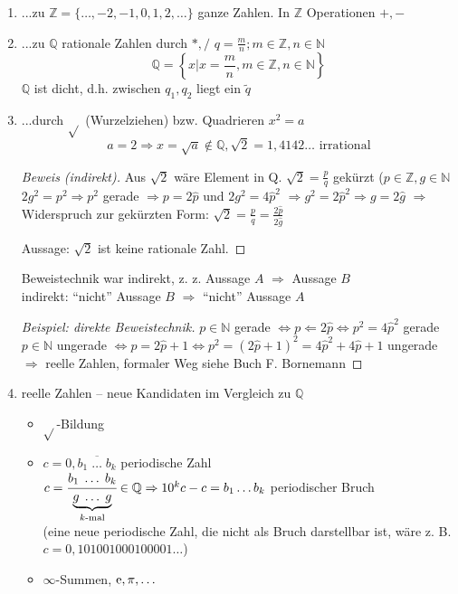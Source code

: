 \begin{enumerate}
 \item ...zu $\mathbb{Z} = \{\ldots,-2,-1,0,1,2,\ldots\}$ ganze Zahlen. In $\mathbb{Z}$ Operationen $+,-$
 \item ...zu $\mathbb{Q}$ rationale Zahlen durch $*,/$ $q=\frac{m}{n}; m \in \mathbb{Z}, n \in \mathbb{N}$
  \begin{equation*}\mathbb{Q} = \left\{x | x=\frac{m}{n}, m \in \mathbb{Z}, n \in \mathbb{N} \right\}\end{equation*}
  $\mathbb{Q}$ ist dicht, d.h. zwischen $q_1, q_2$ liegt ein $\tilde{q}$
 \item ...durch $\sqrt{}$ (Wurzelziehen) bzw. Quadrieren $x^2=a$
 \begin{equation*}a=2 \Rightarrow x = \sqrt{a} \notin \mathbb{Q}, \sqrt{2}=1,4142\ldots\text{ irrational}\end{equation*}

\begin{proof}[Beweis (indirekt)]
Aus $\sqrt{2}$ wäre Element in Q. $\sqrt{2}=\frac{p}{q}$ gekürzt ($p \in \mathbb{Z}, g \in \mathbb{N}$
$2g^2=p^2 \Rightarrow p^2$ gerade $\Rightarrow p=2\hat{p}$ und $2g^2=4\hat{p}^2$
$\Rightarrow g^2 = 2\hat{p}^2 \Rightarrow g=2\hat{g}$ 
$\Rightarrow$ Widerspruch zur gekürzten Form: $\sqrt{2}=\frac{p}{q}=\frac{2\hat{p}}{2\hat{g}}$

Aussage: $\sqrt{2}$ ist keine rationale Zahl.
\end{proof}

Beweistechnik war indirekt, z. z. Aussage $A$ $\Rightarrow$ Aussage $B$\\
indirekt: ``nicht'' Aussage $B$ $\Rightarrow$ ``nicht'' Aussage $A$


\begin{proof}[Beispiel: direkte Beweistechnik]

$p \in \mathbb{N}$ gerade $\Leftrightarrow p \Leftarrow 2 \hat{p} \Leftrightarrow p^2 = 4\hat{p}^2$ gerade\\
$p \in \mathbb{N}$ ungerade $\Leftrightarrow p = 2 \hat{p}+1 \Leftrightarrow p^2 = (2\hat{p}+1)^2=4\hat{p}^2+4\hat{p}+1$ ungerade\\
$\Rightarrow$ reelle Zahlen, formaler Weg siehe Buch F. Bornemann
\end{proof}

 \item reelle Zahlen -- neue Kandidaten im Vergleich zu $\mathbb{Q}$
\begin{itemize}
 \item $\sqrt{}$-Bildung
 \item $c = 0,\overline{b_1 \;\ldots\; b_k}$ periodische Zahl\\
$c = \cfrac{b_1 \;\ldots\; b_k}{\underbrace{g \;\ldots\; g}_{k\text{-mal}}} \in \mathbb{Q} \Rightarrow 10^k c -c = b_1 \ldots b_k$ periodischer Bruch\\
(eine neue periodische Zahl, die nicht als Bruch darstellbar ist, wäre z. B. $c=0,101001000100001\ldots$)
 \item $\infty$-Summen, $\operatorname{e}, \pi,\ldots$
\end{itemize}

\end{enumerate}

